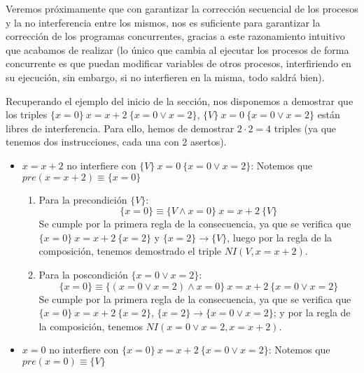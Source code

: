 Veremos próximamente que con garantizar la corrección secuencial de los procesos y la no interferencia entre los mismos, nos es suficiente para garantizar la corrección de los programas concurrentes, gracias a este razonamiento intuitivo que acabamos de realizar (lo único que cambia al ejecutar los procesos de forma concurrente es que puedan modificar variables de otros procesos, interfiriendo en su ejecución, sin embargo, si no interfieren en la misma, todo saldrá bien).

\begin{ejemplo}
    Recuperando el ejemplo del inicio de la sección, nos disponemos a demostrar que los triples $\{x=0\}\ x=x+2\ \{x=0 \lor x=2\}$, $\{V\}\ x=0\ \{x=0 \lor x=2\}$ están libres de interferencia. Para ello, hemos de demostrar $2\cdot 2=4$ triples (ya que tenemos dos instrucciones, cada una con 2 asertos).
    \begin{itemize}
        \item $x=x+2$ no interfiere con $\{V\}\ x=0\ \{x=0 \lor x=2\}$:\newline
            Notemos que $pre(x=x+2) \equiv \{x=0\}$
            \begin{enumerate}
                \item Para la precondición $\{V\}$:
                    \begin{equation*}
                        \{x=0\} \equiv \{V \land x = 0\}\ x=x+2\ \{V\}
                    \end{equation*}
                    Se cumple por la primera regla de la consecuencia, ya que se verifica que $\{x=0\}\ x=x+2\ \{x=2\}$ y $\{x=2\} \rightarrow \{V\}$, luego por la regla de la composición, tenemos demostrado el triple $NI(V, x=x+2)$.
                \item Para la poscondición $\{x=0 \lor x = 2\}$:
                    \begin{equation*}
                        \{x=0\} \equiv \{(x=0 \lor x=2)\land x=0\}\ x=x+2\ \{x=0 \lor x=2\}
                    \end{equation*}
                    Se cumple por la primera regla de la consecuencia, ya que se verifica que $\{x=0\}\ x=x+2\ \{x=2\}$, $\{x=2\} \rightarrow\{x=0 \lor x=2\}$; y por la regla de la composición, tenemos $NI(x=0 \lor x=2, x=x+2)$.
            \end{enumerate}
        \item $x=0$ no interfiere con $\{x=0\}\ x=x+2\ \{x=0 \lor x=2\}$:\newline
            Notemos que $pre(x=0)\equiv \{V\}$

\end{itemize}
\end{ejemplo}
